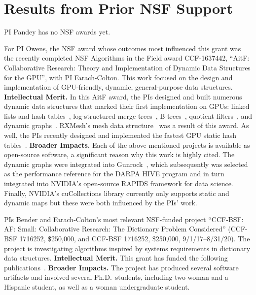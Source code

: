 
\section{Results from Prior NSF Support}

PI Pandey has no NSF awards yet.

For PI Owens, the NSF award whose outcomes most influenced this grant was the recently completed NSF Algorithms in the Field award CCF-1637442, ``AitF\@: Collaborative Research: Theory and Implementation of Dynamic Data Structures for the GPU'', with PI Farach-Colton. This work focused on the design and implementation of GPU-friendly, dynamic, general-purpose data structures.
\textbf{Intellectual Merit.} In this AitF award, the PIs designed and built numerous dynamic data structures that marked their first implementation on GPUs: linked lists and hash tables~\cite{Ashkiani:2018:ADH}, log-structured merge trees~\cite{Ashkiani:2018:GLA}, B-trees~\cite{Awad:2019:EAH}, quotient filters~\cite{GeilFO18}, and dynamic graphs~\cite{Awad:2020:DGO}. RXMesh's mesh data structure~\cite{Mahmoud:2021:RAG} was a result of this award. As well, the PIs recently designed and implemented the fastest GPU static hash tables~\cite{Awad:2023:AAI}.
%
\textbf{Broader Impacts.} Each of the above mentioned projects is available as open-source software, a significant reason why this work is highly cited. The dynamic graphs were integrated into Gunrock~\cite{Awad:2020:DGO,Wang:2017:GGG}, which subsequently was selected as the performance reference for the DARPA HIVE program and in turn integrated into NVIDIA's open-source RAPIDS framework for data science. Finally, NVIDIA's cuCollections library currently only supports static and dynamic maps but these were both influenced by the PIs' work.

PIs Bender and Farach-Colton's most relevant NSF-funded project ``CCF-BSF\@: AF\@: Small: Collaborative Research: The Dictionary Problem Considered''
(CCF-BSF 1716252, \$250,000, and CCF-BSF 1716252, \$250,000, 9/1/17--8/31/20).
The project is investigating algorithms inspired by systems requirements in dictionary data structures.
\textbf{Intellectual Merit.} This grant has funded the following
publications~\cite{AgrawalBeDa20,AgrawalBeFi20,%
ArkinDaGa20,Ashkiani:2018:ADH,Ashkiani:2018:GLA,BenderChDa20,BenderCoFa19,BenderDaJo20,BenderFaGo18,%
BenderFaKu19,BenderGoMe20,BenderKoKu20,ChenMcSi18,ConwayBaJi17b,ConwayFaSh18,ConwayKnJi19,%
DasAgBe20,DasTsDu19,BerceaEv20a,BerceaEv20b,%
ZhanCoJi18,ZhanJaPo18,Mayer18,Pandey19,PandeyAlBe18,PandeyBJP17,%
PandeyBeJo18,Singh18,SinghMaBe20,%
JavanmardGaDa19DISC,%
GoswamiMeMe18,%
GeilFO18,pandey2020timely,%
EvenMeRa18,Awad:2019:EAH,BenderFiGi19,Farach-ColtonLiTs18,BenderKoPe18}.
%
\textbf{Broader Impacts.} The project has produced several software artifacts and involved several Ph.D.\ students, including two woman and a Hispanic student, as well as a woman undergraduate student.

